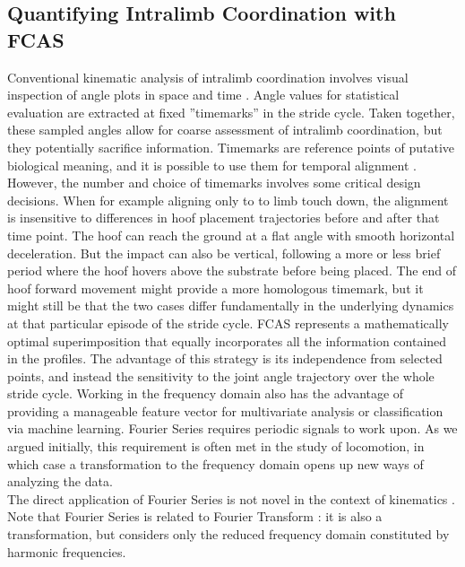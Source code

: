 \documentclass[10pt, a4paper]{article}
\begin{document}
\begin{linenumbers}[1]
\subsection*{Quantifying Intralimb Coordination with FCAS}
Conventional kinematic analysis of intralimb coordination involves visual inspection of angle plots in space and time \citep{Irschick1999,Fischer2002,Stoessel2012,Schmidt2008,Day2007,Polk2002,Nyakatura2010}. 
Angle values for statistical evaluation are extracted at fixed ''timemarks'' in the stride cycle. 
Taken together, these sampled angles allow for coarse assessment of intralimb coordination, but they potentially sacrifice information. 
Timemarks are reference points of putative biological meaning, and it is possible to use them for temporal alignment \citep[e.g.][]{HsiaoWecksler2010}. 
However, the number and choice of timemarks involves some critical design decisions. 
When for example aligning only to to limb touch down, the alignment is insensitive to differences in hoof placement trajectories before and after that time point. 
The hoof can reach the ground at a flat angle with smooth horizontal deceleration. 
But the impact can also be vertical, following a more or less brief period where the hoof hovers above the substrate before being placed. 
The end of hoof forward movement might provide a more homologous timemark, but it might still be that the two cases differ fundamentally in the underlying dynamics at that particular episode of the stride cycle. 
FCAS represents a mathematically optimal superimposition that equally incorporates all the information contained in the profiles. 
The advantage of this strategy is its independence from selected points, and instead the sensitivity to the joint angle trajectory over the whole stride cycle. 
Working in the frequency domain also has the advantage of providing a manageable feature vector for multivariate analysis or classification via machine learning. 
Fourier Series requires periodic signals to work upon. 
As we argued initially, this requirement is often met in the study of locomotion, in which case a transformation to the frequency domain opens up new ways of analyzing the data. 
\\The direct application of Fourier Series \citep{Fourier1822,Gray1995,Bracewell2000} is not novel in the context of kinematics \citep[e.g.][]{Bernstein1935,Webb2007,Wheat2006}. 
Note that Fourier Series is related to Fourier Transform \citep[cf.][]{Bracewell2000,Robertson2018}: it is also a transformation, but considers only the reduced frequency domain constituted by harmonic frequencies. 

\end{linenumbers}
\end{document}
